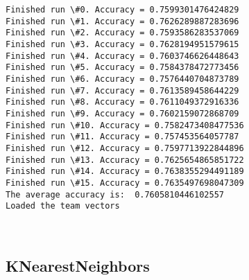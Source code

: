 \documentclass[11pt]{article}
\begin{document}
    \begin{Verbatim}[commandchars=\\\{\}]
Finished run \#0. Accuracy = 0.7599301476424829
Finished run \#1. Accuracy = 0.7626289887283696
Finished run \#2. Accuracy = 0.7593586283537069
Finished run \#3. Accuracy = 0.7628194951579615
Finished run \#4. Accuracy = 0.7603746626448643
Finished run \#5. Accuracy = 0.7584378472773456
Finished run \#6. Accuracy = 0.7576440704873789
Finished run \#7. Accuracy = 0.7613589458644229
Finished run \#8. Accuracy = 0.7611049372916336
Finished run \#9. Accuracy = 0.7602159072868709
Finished run \#10. Accuracy = 0.7582473408477536
Finished run \#11. Accuracy = 0.757453564057787
Finished run \#12. Accuracy = 0.7597713922844896
Finished run \#13. Accuracy = 0.7625654865851722
Finished run \#14. Accuracy = 0.7638355294491189
Finished run \#15. Accuracy = 0.7635497698047309
The average accuracy is:  0.7605810446102557
Loaded the team vectors

    \end{Verbatim}

    \begin{center}
    \end{center}
    { \hspace*{\fill} \\}
    
    \hypertarget{knearestneighbors}{%
\subsection{KNearestNeighbors}\label{knearestneighbors}}
\end{document}
